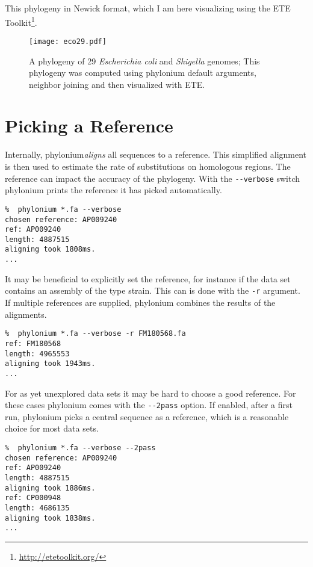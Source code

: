 \documentclass[a4paper,10pt,english]{scrartcl}
\newcommand{\tool}[1]{\textsf{#1}}
\newcommand{\phylonium}{\textsf{phylonium}\xspace}
\begin{document}
This phylogeny in Newick format, which I am here visualizing using the ETE Toolkit\footnote{\url{http://etetoolkit.org/}}.

\begin{figure}
  \begin{center}
    \texttt{[image: eco29.pdf]}
  \end{center}
  \caption{A phylogeny of 29 \textit{Escherichia coli} and \textit{Shigella} genomes; This phylogeny was computed using \tool{phylonium} default arguments, neighbor joining and then visualized with ETE.}
\end{figure}


\section{Picking a Reference}

Internally, \phylonium \emph{aligns} all sequences to a reference. This simplified alignment is then used to estimate the rate of substitutions on homologous regions. The reference can  impact the accuracy of the phylogeny. With the \lstinline!--verbose! switch \phylonium prints the reference it has picked automatically.

\begin{lstlisting}
%  phylonium *.fa --verbose
chosen reference: AP009240
ref: AP009240
length: 4887515
aligning took 1808ms.
...
\end{lstlisting}

It may be beneficial to explicitly set the reference, for instance if the data set contains an assembly of the type strain. This can is done with the \lstinline!-r! argument. If multiple references are supplied, \phylonium combines the results of the alignments.

\begin{lstlisting}
%  phylonium *.fa --verbose -r FM180568.fa
ref: FM180568
length: 4965553
aligning took 1943ms.
...
\end{lstlisting}

For as yet unexplored data sets it may be hard to choose a good reference. For these cases \phylonium comes with the \lstinline!--2pass! option. If enabled, after a first run, \phylonium picks a central sequence as a reference, which is a reasonable choice for most data sets.

\begin{lstlisting}
%  phylonium *.fa --verbose --2pass
chosen reference: AP009240
ref: AP009240
length: 4887515
aligning took 1886ms.
ref: CP000948
length: 4686135
aligning took 1838ms.
...
\end{lstlisting}
\end{document}
